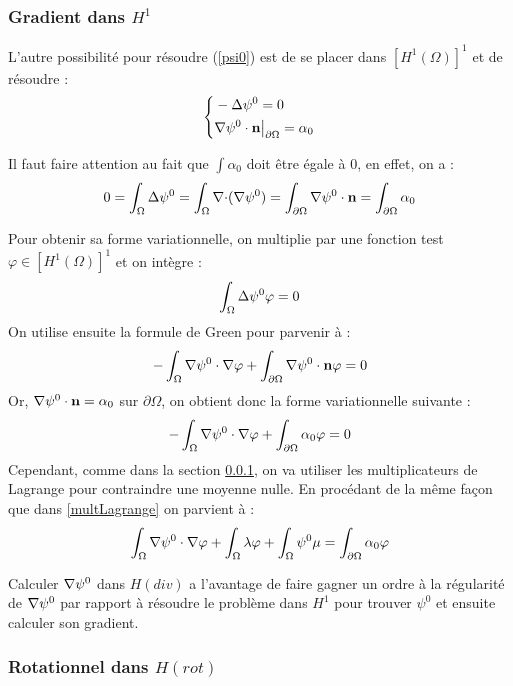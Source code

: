 \subsubsection{Gradient dans $H^1$}
\label{secpsi0hdiv}

L'autre possibilité pour résoudre (\ref{psi0}) est de se placer dans $[H^1(\Omega)]^1$ et de résoudre :
\begin{equation}\label{pbpsi0}
\left\{\begin{aligned}
&-{\Delta}\psi^0 = 0\\
&{\nabla}\psi^0\cdot \mathbf{n}{\big\rvert_{\partial\Omega}}=\alpha_0
\end{aligned}\right.
\end{equation}

Il faut faire attention au fait que $\int \alpha_0$ doit être égale à 0, en effet, on a :
\[ 0=\int_\Omega {\Delta} \psi^0 = \int_\Omega {\nabla\cdot}({\nabla}\psi^0) = \int_{\partial\Omega} {\nabla}\psi^0\cdot \mathbf{n} = \int_{\partial\Omega} \alpha_0 \]

Pour obtenir sa forme variationnelle, on multiplie par une fonction test $\varphi\in [H^1(\Omega)]^1$ et on intègre :
\[ \int_\Omega {\Delta}\psi^0 \varphi = 0 \]
On utilise ensuite la formule de Green pour parvenir à :
\[ -\int_\Omega {\nabla}\psi^0\cdot{\nabla}\varphi + \int_{\partial\Omega} {\nabla}\psi^0\cdot \mathbf{n}\varphi = 0 \]
Or, ${\nabla}\psi^0\cdot \mathbf{n} = \alpha_0$ sur $\partial\Omega$, on obtient donc la forme variationnelle suivante :
\[ -\int_\Omega {\nabla}\psi^0\cdot{\nabla}\varphi + \int_{\partial\Omega} \alpha_0\varphi = 0 \]
Cependant, comme dans la section \ref{secpsi0hdiv}, on va utiliser les multiplicateurs de Lagrange pour contraindre une moyenne nulle. En procédant de la même façon que dans \ref{multLagrange} on parvient à :
\begin{equation}\label{fvpsi0}
\int_\Omega {\nabla}\psi^0\cdot{\nabla}\varphi + \int_\Omega \lambda\varphi + \int_\Omega \psi^0\mu = \int_{\partial\Omega} \alpha_0\varphi
\end{equation}

Calculer ${\nabla}\psi^0$ dans $H(div)$ a l'avantage de faire gagner un ordre à la régularité de ${\nabla}\psi^0$ par rapport à résoudre le problème dans $H^1$ pour trouver $\psi^0$ et ensuite calculer son gradient.\\

\subsubsection{Rotationnel dans $H(rot)$}

